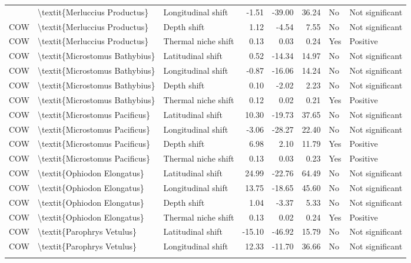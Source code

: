 \begin{longtable}[t]{lllrrrll}
{{\addlinespace
COW & \textbackslash{}textit\{Merluccius Productus\} & Longitudinal shift & -1.51 & -39.00 & 36.24 & No & Not significant\\
COW & \textbackslash{}textit\{Merluccius Productus\} & Depth shift & 1.12 & -4.54 & 7.55 & No & Not significant\\
COW & \textbackslash{}textit\{Merluccius Productus\} & Thermal niche shift & 0.13 & 0.03 & 0.24 & Yes & Positive\\
COW & \textbackslash{}textit\{Microstomus Bathybius\} & Latitudinal shift & 0.52 & -14.34 & 14.97 & No & Not significant\\
COW & \textbackslash{}textit\{Microstomus Bathybius\} & Longitudinal shift & -0.87 & -16.06 & 14.24 & No & Not significant\\
\addlinespace
COW & \textbackslash{}textit\{Microstomus Bathybius\} & Depth shift & 0.10 & -2.02 & 2.23 & No & Not significant\\
COW & \textbackslash{}textit\{Microstomus Bathybius\} & Thermal niche shift & 0.12 & 0.02 & 0.21 & Yes & Positive\\
COW & \textbackslash{}textit\{Microstomus Pacificus\} & Latitudinal shift & 10.30 & -19.73 & 37.65 & No & Not significant\\
COW & \textbackslash{}textit\{Microstomus Pacificus\} & Longitudinal shift & -3.06 & -28.27 & 22.40 & No & Not significant\\
COW & \textbackslash{}textit\{Microstomus Pacificus\} & Depth shift & 6.98 & 2.10 & 11.79 & Yes & Positive\\
\addlinespace
COW & \textbackslash{}textit\{Microstomus Pacificus\} & Thermal niche shift & 0.13 & 0.03 & 0.23 & Yes & Positive\\
COW & \textbackslash{}textit\{Ophiodon Elongatus\} & Latitudinal shift & 24.99 & -22.76 & 64.49 & No & Not significant\\
COW & \textbackslash{}textit\{Ophiodon Elongatus\} & Longitudinal shift & 13.75 & -18.65 & 45.60 & No & Not significant\\
COW & \textbackslash{}textit\{Ophiodon Elongatus\} & Depth shift & 1.04 & -3.37 & 5.33 & No & Not significant\\
COW & \textbackslash{}textit\{Ophiodon Elongatus\} & Thermal niche shift & 0.13 & 0.02 & 0.24 & Yes & Positive\\
\addlinespace
COW & \textbackslash{}textit\{Parophrys Vetulus\} & Latitudinal shift & -15.10 & -46.92 & 15.79 & No & Not significant\\
COW & \textbackslash{}textit\{Parophrys Vetulus\} & Longitudinal shift & 12.33 & -11.70 & 36.66 & No & Not significant\\
}}
\end{longtable}
